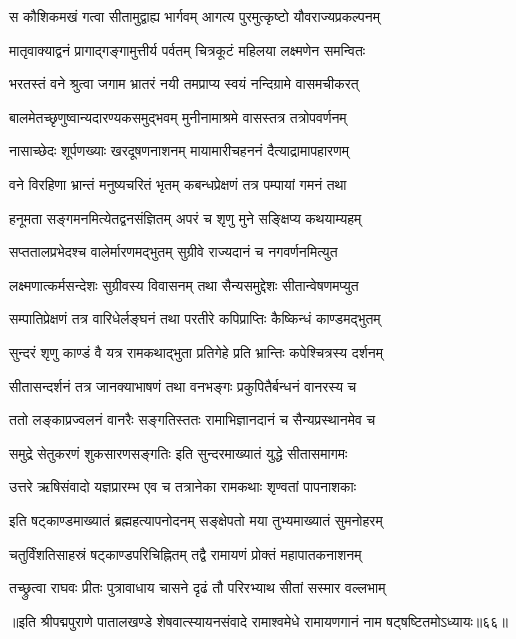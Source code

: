 \twolineshloka
{स कौशिकमखं गत्वा सीतामुद्वाह्य भार्गवम्}
{आगत्य पुरमुत्कृष्टो यौवराज्यप्रकल्पनम्}%

\twolineshloka
{मातृवाक्याद्वनं प्रागाद्गङ्गामुत्तीर्य पर्वतम्}
{चित्रकूटं महिलया लक्ष्मणेन समन्वितः}%

\twolineshloka
{भरतस्तं वने श्रुत्वा जगाम भ्रातरं नयी}
{तमप्राप्य स्वयं नन्दिग्रामे वासमचीकरत्}%

\twolineshloka
{बालमेतच्छृणुष्वान्यदारण्यकसमुद्भवम्}
{मुनीनामाश्रमे वासस्तत्र तत्रोपवर्णनम्}%

\twolineshloka
{नासाच्छेदः शूर्पणख्याः खरदूषणनाशनम्}
{मायामारीचहननं दैत्याद्रामापहारणम्}%

\twolineshloka
{वने विरहिणा भ्रान्तं मनुष्यचरितं भृतम्}
{कबन्धप्रेक्षणं तत्र पम्पायां गमनं तथा}%

\twolineshloka
{हनूमता सङ्गमनमित्येतद्वनसंज्ञितम्}
{अपरं च शृणु मुने सङ्क्षिप्य कथयाम्यहम्}%

\twolineshloka
{सप्ततालप्रभेदश्च वालेर्मारणमद्भुतम्}
{सुग्रीवे राज्यदानं च नगवर्णनमित्युत}%

\twolineshloka
{लक्ष्मणात्कर्मसन्देशः सुग्रीवस्य विवासनम्}
{तथा सैन्यसमुद्देशः सीतान्वेषणमप्युत}%

\twolineshloka
{सम्पातिप्रेक्षणं तत्र वारिधेर्लङ्घनं तथा}
{परतीरे कपिप्राप्तिः कैष्किन्धं काण्डमद्भुतम्}%

\twolineshloka
{सुन्दरं शृणु काण्डं वै यत्र रामकथाद्भुता}
{प्रतिगेहे प्रति भ्रान्तिः कपेश्चित्रस्य दर्शनम्}%

\twolineshloka
{सीतासन्दर्शनं तत्र जानक्याभाषणं तथा}
{वनभङ्गः प्रकुपितैर्बन्धनं वानरस्य च}%

\twolineshloka
{ततो लङ्काप्रज्वलनं वानरैः सङ्गतिस्ततः}
{रामाभिज्ञानदानं च सैन्यप्रस्थानमेव च}%

\twolineshloka
{समुद्रे सेतुकरणं शुकसारणसङ्गतिः}
{इति सुन्दरमाख्यातं युद्धे सीतासमागमः}%

\twolineshloka
{उत्तरे ऋषिसंवादो यज्ञप्रारम्भ एव च}
{तत्रानेका रामकथाः शृण्वतां पापनाशकाः}%

\twolineshloka
{इति षट्काण्डमाख्यातं ब्रह्महत्यापनोदनम्}
{सङ्क्षेपतो मया तुभ्यमाख्यातं सुमनोहरम्}%

\twolineshloka
{चतुर्विंशतिसाहस्रं षट्काण्डपरिचिह्नितम्}
{तद्वै रामायणं प्रोक्तं महापातकनाशनम्}%

\twolineshloka
{तच्छ्रुत्वा राघवः प्रीतः पुत्रावाधाय चासने}
{दृढं तौ परिरभ्याथ सीतां सस्मार वल्लभाम्}%

॥इति श्रीपद्मपुराणे पातालखण्डे शेषवात्स्यायनसंवादे रामाश्वमेधे रामायणगानं नाम षट्षष्टितमोऽध्यायः॥६६॥

